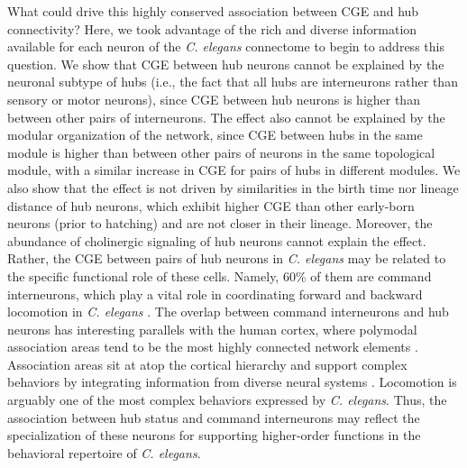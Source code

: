 \documentclass[10pt,letterpaper]{article}
\begin{document}
{%
What could drive this highly conserved association between CGE and hub connectivity?
Here, we took advantage of the rich and diverse information available for each neuron of the \emph{C. elegans} connectome to begin to address this question.
We show that CGE between hub neurons cannot be explained by the neuronal subtype of hubs (i.e., the fact that all hubs are interneurons rather than  sensory or motor neurons), since CGE between hub neurons is higher than between other pairs of interneurons.
The effect also cannot be explained by the modular organization of the network, since CGE between hubs in the same module is higher than between other pairs of neurons in the same topological module, with a similar increase in CGE for pairs of hubs in different modules.
We also show that the effect is not driven by similarities in the birth time nor lineage distance of hub neurons, which exhibit higher CGE than other early-born neurons (prior to hatching) and are not closer in their lineage.
Moreover, the abundance of cholinergic signaling of hub neurons cannot explain the effect.
Rather, the CGE between pairs of hub neurons in \textit{C. elegans} may be related to the specific functional role of these cells.
Namely, 60\% of them are command interneurons, which play a vital role in coordinating forward and backward locomotion in \textit{C. elegans} \cite{Kim:2016gl}.
The overlap between command interneurons and hub neurons has interesting parallels with the human cortex, where polymodal association areas tend to be the most highly connected network elements \cite{VandenHeuvel2016}.
Association areas sit at atop the cortical hierarchy and support complex behaviors by integrating information from diverse neural systems \cite{Mesulam1998}.
Locomotion is arguably one of the most complex behaviors expressed by \emph{C. elegans}.
Thus, the association between hub status and command interneurons may reflect the specialization of these neurons for supporting higher-order functions in the behavioral repertoire of \emph{C. elegans}.

}
\end{document}
